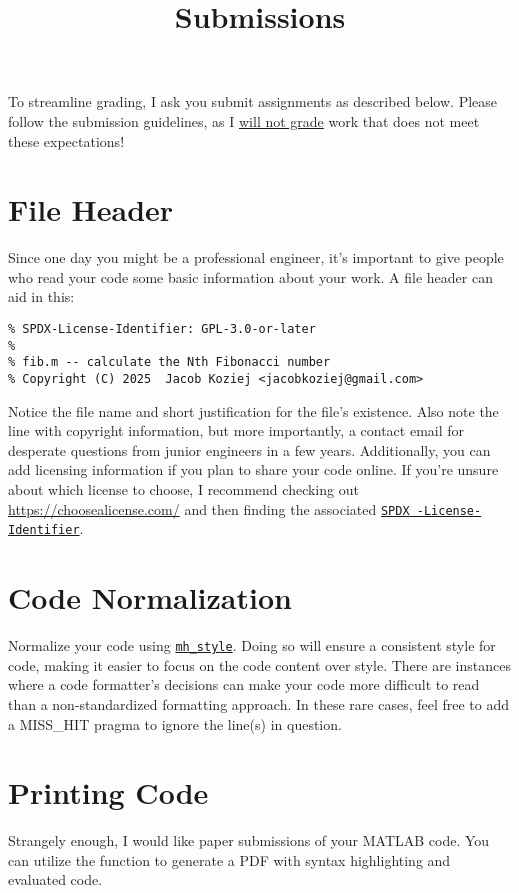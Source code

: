 \documentclass{article}
\title{Submissions}
\begin{document}
\renderTitle

To streamline grading, I ask you submit assignments as described below.
Please follow the submission guidelines, as I \underline{will not grade}
work that does not meet these expectations!

\section{File Header}

Since one day you might be a professional engineer, it's important to
give people who read your code some basic information about your work. A
file header can aid in this:

\begin{verbatim}
% SPDX-License-Identifier: GPL-3.0-or-later
%
% fib.m -- calculate the Nth Fibonacci number
% Copyright (C) 2025  Jacob Koziej <jacobkoziej@gmail.com>
\end{verbatim}

Notice the file name and short justification for the file's existence.
Also note the line with copyright information, but more importantly, a
contact email for desperate questions from junior engineers in a few
years.  Additionally, you can add licensing information if you plan to
share your code online.  If you're unsure about which license to choose,
I recommend checking out \url{https://choosealicense.com/} and then
finding the associated \href{https://spdx.org/licenses/}{\texttt{SPDX%
-License-Identifier}}.

\section{Code Normalization}

Normalize your code using \href{https://florianschanda.github.io/%
miss_hit/style_checker.html}{\texttt{mh\_style}}.  Doing so will ensure
a consistent style for code, making it easier to focus on the code
content over style.  There are instances where a code formatter's
decisions can make your code more difficult to read than a
non-standardized formatting approach.  In these rare cases, feel free to
add a MISS\_HIT pragma to ignore the line(s) in question.

\section{Printing Code}

Strangely enough, I would like paper submissions of your MATLAB code.
You can utilize the  function to generate a PDF with syntax
highlighting and evaluated code.
\end{document}
